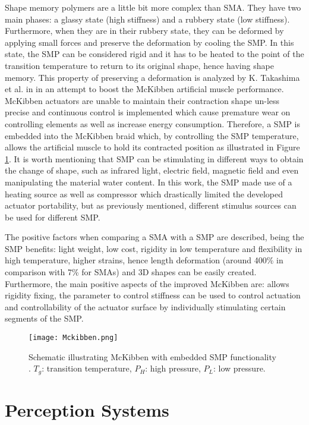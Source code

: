 Shape memory polymers are a little bit more complex than SMA. They have two main phases: a glassy state (high stiffness) and a rubbery state (low stiffness). Furthermore, when they are in their rubbery state, they can be deformed by applying small forces and preserve the deformation by cooling the SMP. In this state, the SMP can be considered rigid and it has to be heated to the point of the transition temperature to return to its original shape, hence having shape memory. This property of preserving a deformation is analyzed by K. Takashima et al. in \cite{Takashima2010} in an attempt to boost the McKibben artificial muscle performance. McKibben actuators are unable to maintain their contraction shape un-less precise and continuous control is implemented which cause premature wear on controlling elements as well as increase energy consumption. Therefore, a SMP is embedded into the McKibben braid which, by controlling the SMP temperature, allows the artificial muscle to hold its contracted position as illustrated in Figure \ref{fig:mckibben}. It is worth mentioning that SMP can be stimulating in different ways to obtain the change of shape, such as infrared light, electric field, magnetic field and even manipulating the material water content. In this work, the SMP made use of a heating source as well as compressor which drastically limited the developed actuator portability, but as previously mentioned, different stimulus sources can be used for different SMP.

The positive factors when comparing a SMA with a SMP are described, being the SMP benefits: light weight, low cost, rigidity in low temperature and flexibility in high temperature, higher strains, hence length deformation (around 400\% in comparison with 7\% for SMAs) and 3D shapes can be easily created. Furthermore, the main positive aspects of the improved McKibben are: allows rigidity fixing, the parameter to control stiffness can be used to control actuation and controllability of the actuator surface by individually stimulating certain segments of the SMP.

\begin{figure}[hb!]
    \centering
    \texttt{[image: Mckibben.png]}
    \caption{Schematic illustrating McKibben with embedded SMP functionality \cite{Takashima2010}. $T_g$: transition temperature, $P_H$: high pressure, $P_L$: low pressure. }
    \label{fig:mckibben}
\end{figure}

\section{Perception Systems}
